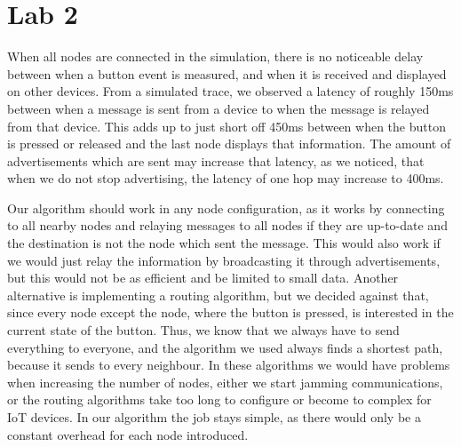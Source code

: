


\maketitle

\setcounter{section}{2}

\setcounter{exercise}{1}

\section*{Lab 2}

\begin{exercise}
    When all nodes are connected in the simulation, there is no noticeable delay between when a button event is measured, and when it is received and displayed on other devices.
    From a simulated trace, we observed a latency of roughly 150ms between when a message is sent from a device to when the message is relayed from that device.
    This adds up to just short off 450ms between when the button is pressed or released and the last node displays that information.
    The amount of advertisements which are sent may increase that latency, as we noticed, that when we do not stop advertising, the latency of one hop may increase to 400ms.

    Our algorithm should work in any node configuration, as it works by connecting to all nearby nodes and relaying messages to all nodes if they are up-to-date and the destination is not the node which sent the message.
    This would also work if we would just relay the information by broadcasting it through advertisements, but this would not be as efficient and be limited to small data.
    Another alternative is implementing a routing algorithm, but we decided against that, since every node except the node, where the button is pressed, is interested in the current state of the button.
    Thus, we know that we always have to send everything to everyone, and the algorithm we used always finds a shortest path, because it sends to every neighbour.
    In these algorithms we would have problems when increasing the number of nodes, either we start jamming communications, or the routing algorithms take too long to configure or become to complex for IoT devices.
    In our algorithm the job stays simple, as there would only be a constant overhead for each node introduced.


\end{exercise}
